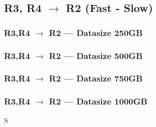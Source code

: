 \newpage


\subsection{R3, R4 $\rightarrow$ R2 (Fast - Slow)}
\subsubsection{R3,R4 $\rightarrow$ R2 --- Datasize 250GB}



\newpage
\subsubsection{R3,R4 $\rightarrow$ R2 --- Datasize 500GB}



\newpage
\subsubsection{R3,R4 $\rightarrow$ R2 --- Datasize 750GB}



\newpage
\subsubsection{R3,R4 $\rightarrow$ R2 --- Datasize 1000GB}



\newpage
S
